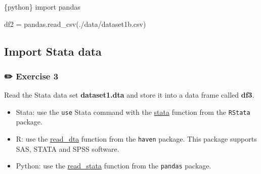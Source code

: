 \documentclass[
  letterpaper,
  DIV=11,
  numbers=noendperiod,
  oneside]{scrreprt}
\newenvironment{Shaded}{\begin{snugshade}}{\end{snugshade}}
\newcommand{\ImportTok}[1]{\textcolor[rgb]{0.00,0.46,0.62}{#1}}
\newcommand{\InformationTok}[1]{\textcolor[rgb]{0.37,0.37,0.37}{#1}}
\newcommand{\NormalTok}[1]{\textcolor[rgb]{0.00,0.23,0.31}{#1}}
\newcommand{\OperatorTok}[1]{\textcolor[rgb]{0.37,0.37,0.37}{#1}}
\newcommand{\StringTok}[1]{\textcolor[rgb]{0.13,0.47,0.30}{#1}}
\providecommand{\tightlist}{%
  \setlength{\itemsep}{0pt}\setlength{\parskip}{0pt}}\usepackage{longtable,booktabs,array}
\begin{document}
\begin{Shaded}
\begin{Highlighting}[]
\InformationTok{\textasciigrave{}\textasciigrave{}\textasciigrave{}\{python\}}
\ImportTok{import}\NormalTok{ pandas}

\NormalTok{df2 }\OperatorTok{=}\NormalTok{ pandas.read\_csv(}\StringTok{\textquotesingle{}./data/dataset1b.csv\textquotesingle{}}\NormalTok{)}
\InformationTok{\textasciigrave{}\textasciigrave{}\textasciigrave{}}
\end{Highlighting}
\end{Shaded}

\hypertarget{import-stata-data}{%
\subsection{Import Stata data}\label{import-stata-data}}

\subsubsection{\texorpdfstring{{✏️} Exercise 3}{✏️ Exercise 3}}

Read the Stata data set \textbf{dataset1.dta} and store it into a data
frame called \textbf{df3}.

\begin{tcolorbox}[enhanced jigsaw, coltitle=black, opacityback=0, title=\textcolor{quarto-callout-tip-color}{\faLightbulb}\hspace{0.5em}{Tip}, toprule=.15mm, bottomtitle=1mm, colbacktitle=quarto-callout-tip-color!10!white, colframe=quarto-callout-tip-color-frame, left=2mm, opacitybacktitle=0.6, bottomrule=.15mm, arc=.35mm, toptitle=1mm, colback=white, titlerule=0mm, breakable, leftrule=.75mm, rightrule=.15mm]

\begin{itemize}
\tightlist
\item
  Stata: use the \texttt{use} Stata command with the
  \href{https://rdrr.io/github/lbraglia/RStata/man/stata.html}{stata}
  function from the \texttt{RStata} package.
\item
  R: use the
  \href{https://haven.tidyverse.org/reference/read_dta.html}{read\_dta}
  function from the \texttt{haven} package. This package supports SAS,
  STATA and SPSS software.
\item
  Python: use the
  \href{https://pandas.pydata.org/docs/reference/api/pandas.read_stata.html}{read\_stata}
  function from the \texttt{pandas} package.
\end{itemize}

\end{tcolorbox}
\end{document}
